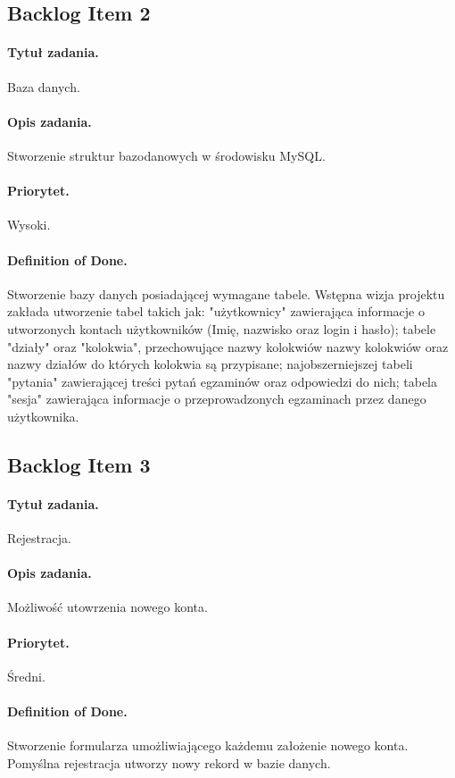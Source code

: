 \documentclass[a4paper]{article}
\begin{document}
\subsection{Backlog Item 2}
\paragraph{Tytuł zadania.} Baza danych.
\paragraph{Opis zadania.} Stworzenie struktur bazodanowych w środowisku MySQL.
\paragraph{Priorytet.} Wysoki.
\paragraph{Definition of Done.} Stworzenie bazy danych posiadającej wymagane tabele. Wstępna wizja projektu zakłada utworzenie tabel takich jak: "użytkownicy" zawierająca informacje o utworzonych kontach użytkowników (Imię, nazwisko oraz login i  hasło); tabele "działy" oraz "kolokwia", przechowujące nazwy kolokwiów nazwy kolokwiów oraz nazwy działów do których kolokwia są przypisane; najobszerniejszej tabeli "pytania" zawierającej treści pytań egzaminów oraz odpowiedzi do nich; tabela "sesja" zawierająca informacje o przeprowadzonych egzaminach przez danego użytkownika.  

\subsection{Backlog Item 3}
\paragraph{Tytuł zadania.} Rejestracja.
\paragraph{Opis zadania.} Możliwość utowrzenia nowego konta.
\paragraph{Priorytet.} Średni.
\paragraph{Definition of Done.} Stworzenie formularza umożliwiającego każdemu założenie nowego konta. Pomyślna rejestracja utworzy nowy rekord w bazie danych.
\end{document}
